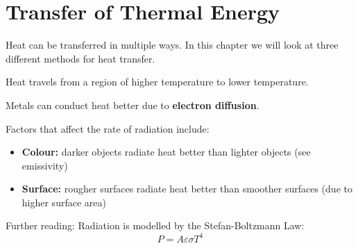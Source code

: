 \documentclass[../main.tex]{subfiles}
\begin{document}
	\section{Transfer of Thermal Energy}
	\begin{preamb}
		Heat can be transferred in multiple ways. In this chapter we will look at three different methods for heat transfer.
	\end{preamb}	
	
	Heat travels from a region of higher temperature to lower temperature.
	
	
	Metals can conduct heat better due to \textbf{electron diffusion}.
	
	Factors that affect the rate of radiation include:
	\begin{itemize}
		\item \textbf{Colour:} darker objects radiate heat better than lighter objects (see emissivity)
		\item \textbf{Surface:} rougher surfaces radiate heat better than smoother surfaces (due to higher surface area)
	\end{itemize}
	Further reading: Radiation is modelled by the Stefan-Boltzmann Law:
		\[ P = A \varepsilon \sigma T^4 \]
\end{document}
